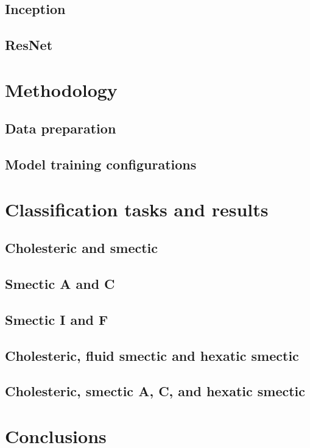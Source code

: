 \documentclass[12pt]{article}
\begin{document}
\subsection{Inception}

\subsection{ResNet}

\section{Methodology}

\subsection{Data preparation}

\subsection{Model training configurations}

\section{Classification tasks and results}

\subsection{Cholesteric and smectic}

\subsection{Smectic A and C}

\subsection{Smectic I and F}

\subsection{Cholesteric, fluid smectic and hexatic smectic}

\subsection{Cholesteric, smectic A, C, and hexatic smectic}

\section{Conclusions}



\appendix
\appendixpage
\end{document}
